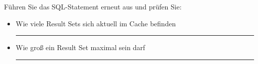     \item Führen Sie das SQL-Statement erneut aus und prüfen Sie:
    \begin{itemize}
      \item Wie viele Result Sets sich aktuell im Cache befinden

        \rule{0.88\textwidth}{0.5pt}

      \item Wie groß ein Result Set maximal sein darf

        \rule{0.88\textwidth}{0.5pt}

    \end{itemize}
